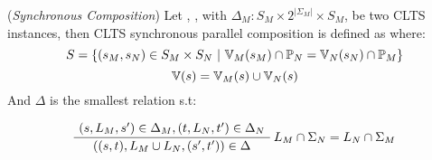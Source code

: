 
\begin{definition} 
	\label{def:synchronous_composition}(\emph{Synchronous Composition}) 
	Let , , with $\Delta_M : S_M \times 2^{|\Sigma_M|} \times S_M$, be two CLTS instances, then CLTS synchronous parallel composition is defined as  where:\\
	 \[S = \{(s_M,s_N) \in S_M \times S_N~|~ \mathbb{V}_M(s_M) \cap \mathbb{P}_N = \mathbb{V}_N(s_N) \cap \mathbb{P}_M  \}\]
	 \[ \mathbb{V}(s) = \mathbb{V}_M(s) \cup \mathbb{V}_N(s)\] 
	 And $\Delta$ is the smallest relation s.t:
	\begin{center}
		\begin{equation}
		\AxiomC{$(s, \actionLabel_M, s') \in \Delta_M,(t, \actionLabel_N, t') \in \Delta_N  $}\RightLabel{$\actionLabel_M \cap \Sigma_N = \actionLabel_N \cap \Sigma_M$}
		\UnaryInfC{$((s,t),\actionLabel_M \cup \actionLabel_N,(s',t')) \in \Delta$}
		\DisplayProof	
		\end{equation}	
	\end{center}
\end{definition}